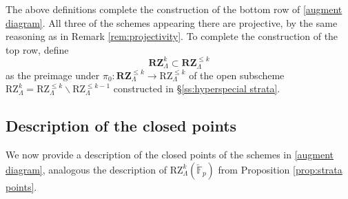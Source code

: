 \documentclass[11pt]{alggeom}
\newcommand{\F}{\mathbb F}
\begin{document}
The above definitions complete the construction of the bottom row of  \eqref{augment diagram}.
All three of the schemes appearing there are projective, by the same reasoning as in Remark \ref{rem:projectivity}.  
To complete the construction of  the top row,  define 
 \[
 \mathbf{RZ}_\Lambda^k \subset  \mathbf{RZ}_\Lambda^{\le k}
  \]
 as the preimage   under $\pi_0 :  \mathbf{RZ}_\Lambda^{\le k}  \to  \mathrm{RZ}_\Lambda^{\le k}$
of the open subscheme  $\mathrm{RZ}_\Lambda^k  =  \mathrm{RZ}^{\le k}_\Lambda \smallsetminus  \mathrm{RZ}^{\le k-1}_\Lambda$  constructed in   \S \ref{ss:hyperspecial strata}. 



\subsection{Description of the closed points}



We now provide a description of the closed points of the schemes in \eqref{augment diagram}, 
analogous the description of $\mathrm{RZ}^k_\Lambda(\breve{\F}_p)$ from Proposition  \ref{prop:strata points}.
\end{document}
